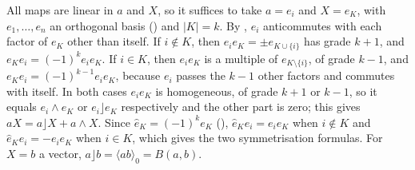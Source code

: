 All maps are linear in $a$ and $X$, so it suffices to take $a = e_i$ and $X = e_K$, with $e_1, \dots, e_n$ an orthogonal basis () and $|K| = k$. By , $e_i$ anticommutes with each factor of $e_K$ other than itself. If $i \notin K$, then $e_i e_K = \pm e_{K \cup \{i\}}$ has grade $k + 1$, and $e_K e_i = (-1)^{k} e_i e_K$. If $i \in K$, then $e_i e_K$ is a multiple of $e_{K \setminus \{i\}}$, of grade $k - 1$, and $e_K e_i = (-1)^{k-1} e_i e_K$, because $e_i$ passes the $k - 1$ other factors and commutes with itself. In both cases $e_i e_K$ is homogeneous, of grade $k + 1$ or $k - 1$, so it equals $e_i \wedge e_K$ or $e_i \rfloor e_K$ respectively and the other part is zero; this gives $aX = a \rfloor X + a \wedge X$. Since $\hat{e}_K = (-1)^{k} e_K$ (), $\hat{e}_K e_i = e_i e_K$ when $i \notin K$ and $\hat{e}_K e_i = -e_i e_K$ when $i \in K$, which gives the two symmetrisation formulas. For $X = b$ a vector, $a \rfloor b = \langle ab \rangle_0 = B(a, b)$.
